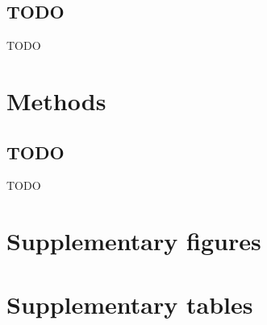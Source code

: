 \documentclass[a4paper,11pt,abstracton,hidelinks]{scrartcl}
\newcommand{\beginsupplement}{%
  \setcounter{table}{0}
  \renewcommand{\thetable}{S\arabic{table}}%
  \setcounter{figure}{0}
  \renewcommand{\thefigure}{S\arabic{figure}}%
}
\begin{document}
\subsection*{TODO}


TODO


\section*{Methods}


\subsection*{TODO}

TODO


\printbibliography


\beginsupplement


\section*{Supplementary figures}

\clearpage


\section*{Supplementary tables}

\clearpage
\end{document}
